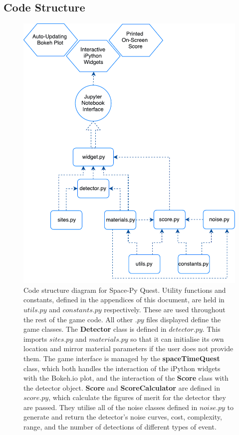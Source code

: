 \documentclass{article}
\begin{document}
\subsection{Code Structure}
\label{sec::structure}
\begin{figure}[h!]
    \centering
    \includegraphics[scale=0.75]{SPQstructure.pdf}
    \caption{Code structure diagram for Space-Py Quest. Utility functions and constants, defined in the appendices of this document, are held in $utils.py$ and $constants.py$ respectively. These are used throughout the rest of the game code. All other $.py$ files displayed define the game classes. The \textbf{Detector} class is defined in $detector.py$. This imports $sites.py$ and $materials.py$ so that it can initialise its own location and mirror material parameters if the user does not provide them. The game interface is managed by the \textbf{spaceTimeQuest} class, which both handles the interaction of the iPython widgets with the Bokeh.io plot, and the interaction of the \textbf{Score} class with the detector object. \textbf{Score} and \textbf{ScoreCalculator} are defined in $score.py$, which calculate the figures of merit for the detector they are passed. They utilise all of the noise classes defined in $noise.py$ to generate and return the detector's noise curves, cost, complexity, range, and the number of detections of different types of event.}
    \label{fig:spq1}
\end{figure}
\end{document}
